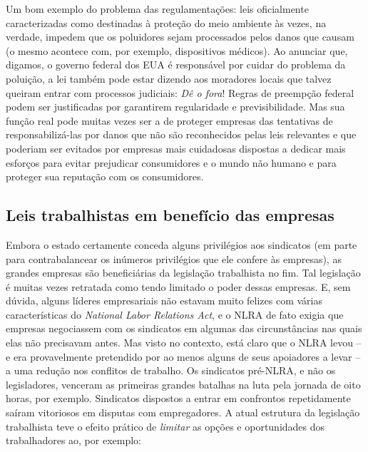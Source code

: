 Um bom exemplo do problema das regulamentações: leis oficialmente caracterizadas como destinadas à proteção do meio ambiente às vezes, na verdade, impedem que os poluidores sejam processados pelos danos que causam (o mesmo acontece com, por exemplo, dispositivos médicos). Ao anunciar que, digamos, o governo federal dos EUA é responsável por cuidar do problema da poluição, a lei também pode estar dizendo aos moradores locais que talvez queiram entrar com processos judiciais: \emph{Dê o fora}! Regras de preempção federal podem ser justificadas por garantirem regularidade e previsibilidade. Mas sua função real pode muitas vezes ser a de proteger empresas das tentativas de responsabilizá-las por danos que não são reconhecidos pelas leis relevantes e que poderiam ser evitados por empresas mais cuidadosas dispostas a dedicar mais esforços para evitar prejudicar consumidores e o mundo não humano e para proteger sua reputação com os consumidores.

\subsection*{Leis trabalhistas em benefício das empresas}

Embora o estado certamente conceda alguns privilégios aos sindicatos (em parte para contrabalancear os inúmeros privilégios que ele confere às empresas), as grandes empresas são beneficiárias da legislação trabalhista no fim. Tal legislação é muitas vezes retratada como tendo limitado o poder dessas empresas. E, sem dúvida, alguns líderes empresariais não estavam muito felizes com várias características do \emph{National Labor Relations Act}, e o NLRA de fato exigia que empresas negociassem com os sindicatos em algumas das circunstâncias nas quais elas não precisavam antes. Mas visto no contexto, está claro que o NLRA levou -- e era provavelmente pretendido por ao menos alguns de seus apoiadores a levar -- a uma redução nos conflitos de trabalho. Os sindicatos pré-NLRA, e não os legisladores, venceram as primeiras grandes batalhas na luta pela jornada de oito horas, por exemplo. Sindicatos dispostos a entrar em confrontos repetidamente saíram vitoriosos em disputas com empregadores. A atual estrutura da legislação trabalhista teve o efeito prático de \emph{limitar} as opções e oportunidades dos trabalhadores ao, por exemplo:


